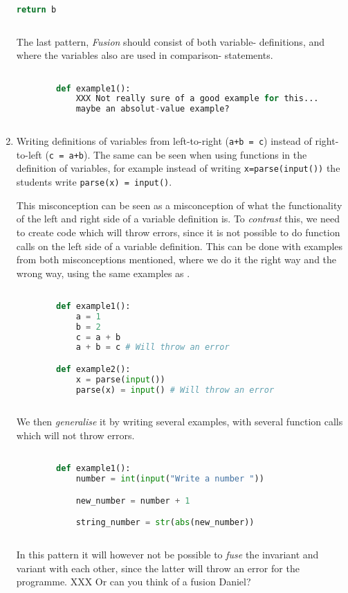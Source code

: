 \begin{enumerate}
\begin{lstlisting}[language=Python]
            return b
            
    \end{lstlisting}
      
      The last pattern, \emph{Fusion} should consist of both variable-
definitions, and where the variables also are used in comparison-
statements. 

      \begin{lstlisting}[language=Python]

        def example1():
            XXX Not really sure of a good example for this... 
            maybe an absolut-value example?
                
    \end{lstlisting}
    \item Writing definitions of variables from left-to-right 
      (\texttt{a+b = c}) instead of right-to-left 
      (\texttt{c = a+b}). The same can be seen when using 
functions 
      in the definition of variables, for example instead of writing 
      \texttt{x=parse(input())} the students write 
      \texttt{parse(x) = input()}.

      This misconception can be seen as a misconception of what the 
functionality of the left and right side of a variable definition is. 
To \emph{contrast} this, we need to create code which will throw 
errors, since it is not possible to do function calls on the left 
side of a variable definition. This can be done with examples from 
both misconceptions mentioned, where we do it the right way and the 
wrong way, using the same examples as \textcite{GuoMarkelZhang2020}.

      \begin{lstlisting}[language=Python]

        def example1():
            a = 1
            b = 2
            c = a + b
            a + b = c # Will throw an error

        def example2():
            x = parse(input())
            parse(x) = input() # Will throw an error
            
    \end{lstlisting}
      
      We then \emph{generalise} it by writing several examples, with 
several function calls which will not throw errors. 

      \begin{lstlisting}[language=Python]

        def example1():
            number = int(input("Write a number "))

            new_number = number + 1

            string_number = str(abs(new_number))
            
    \end{lstlisting}
      
      In this pattern it will however not be possible to \emph{fuse} the 
invariant and variant with each other, since the latter will throw an 
error for the programme. XXX Or can you think of a fusion Daniel?
\end{enumerate}


